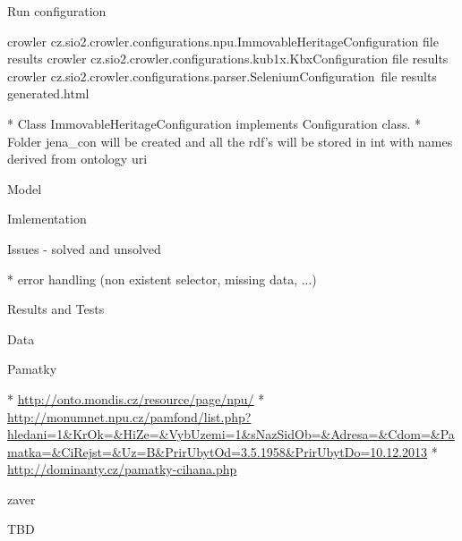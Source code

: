 \secc Run configuration 

\begtt
crowler cz.sio2.crowler.configurations.npu.ImmovableHeritageConfiguration file results
crowler cz.sio2.crowler.configurations.kub1x.KbxConfiguration file results
crowler cz.sio2.crowler.configurations.parser.SeleniumConfiguration\
         file results generated.html
\endtt

\begitems
  * Class ImmovableHeritageConfiguration implements Configuration class. 
  * Folder jena\_con will be created and all the rdf's will be stored in int with names derived from ontology uri
\enditems




\sec Model




\sec Imlementation




\sec Issues - solved and unsolved

\begitems
  * error handling (non existent selector, missing data, ...)
\enditems














\chap Results and Tests 


\sec Data


\secc Pamatky

\begitems
  * \url{http://onto.mondis.cz/resource/page/npu/}
  * \url{http://monumnet.npu.cz/pamfond/list.php?hledani=1&KrOk=&HiZe=&VybUzemi=1&sNazSidOb=&Adresa=&Cdom=&Pamatka=&CiRejst=&Uz=B&PrirUbytOd=3.5.1958&PrirUbytDo=10.12.2013}
  * \url{http://dominanty.cz/pamatky-cihana.php}
\enditems





\chap zaver

TBD


\bye
